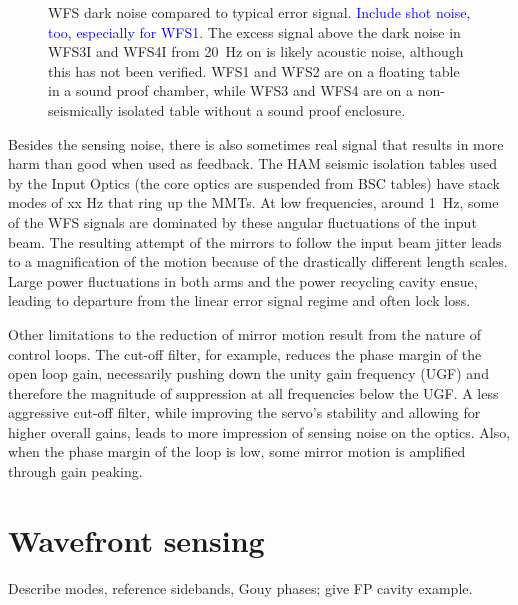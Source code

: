 \begin{figure}
\begin{centering}
\caption{WFS dark noise compared to typical error signal. \textcolor{blue}{Include shot noise, too, especially for WFS1.} The excess signal above the dark noise in WFS3I and WFS4I from 20~Hz on is likely acoustic noise, although this has not been verified. WFS1 and WFS2 are on a floating table in a sound proof chamber, while WFS3 and WFS4 are on a non-seismically isolated table without a sound proof enclosure.}
\label{fig:WFSdarknoise}
\end{centering}
\end{figure}

Besides the sensing noise, there is also sometimes real signal that results in more harm than good when used as feedback. The HAM seismic isolation tables used by the Input Optics (the core optics are suspended from BSC tables) have stack modes of xx Hz that ring up the MMTs.  At low frequencies, around 1~Hz, some of the WFS signals are dominated by these angular fluctuations of the input beam. The resulting attempt of the mirrors to follow the input beam jitter leads to a magnification of the motion because of the drastically different length scales. Large power fluctuations in both arms and the power recycling cavity ensue, leading to departure from the linear error signal regime and often lock loss. 

Other limitations to the reduction of mirror motion result from the nature of control loops. The cut-off filter, for example, reduces the phase margin of the open loop gain, necessarily pushing down the unity gain frequency (UGF) and therefore the magnitude of suppression at all frequencies below the UGF. A less aggressive cut-off filter, while improving the servo's stability and allowing for higher overall gains, leads to more impression of sensing noise on the optics. Also, when the phase margin of the loop is low, some mirror motion is amplified through gain peaking.





\section{Wavefront sensing}
\label{sec:wfs}
Describe modes, reference sidebands, Gouy phases; give FP cavity example. 




